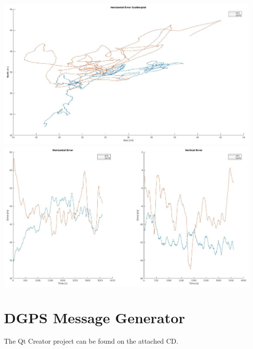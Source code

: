 





\begin{centering}
 \includegraphics[width=\textwidth]{appendix/C_Matlab/Scatterplot.jpg}
 \includegraphics[width=\textwidth]{appendix/C_Matlab/Horizontal_Vertical_Errors.jpg}
\end{centering}


\chapter{DGPS Message Generator}

The Qt Creator project can be found on the attached CD.